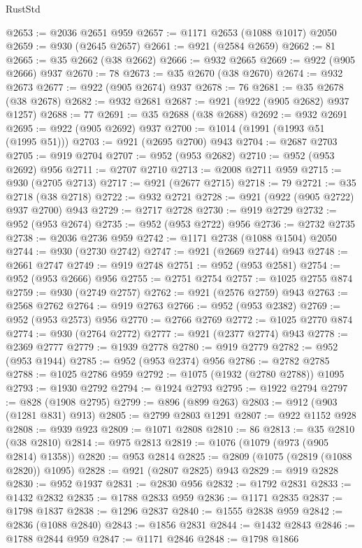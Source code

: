 \begin{lexlean}{RustStd}
\begin{coremodule}
@2653 := @2036 @2651 @959
@2657 := @1171 @2653 (@1088 @1017) @2050
@2659 := @930 (@2645 @2657)
@2661 := @921 (@2584 @2659)
@2662 := 81
@2665 := @35 @2662 (@38 @2662)
@2666 := @932 @2665
@2669 := @922 (@905 @2666) @937
@2670 := 78
@2673 := @35 @2670 (@38 @2670)
@2674 := @932 @2673
@2677 := @922 (@905 @2674) @937
@2678 := 76
@2681 := @35 @2678 (@38 @2678)
@2682 := @932 @2681
@2687 := @921 (@922 (@905 @2682) @937 @1257)
@2688 := 77
@2691 := @35 @2688 (@38 @2688)
@2692 := @932 @2691
@2695 := @922 (@905 @2692) @937
@2700 := @1014 (@1991 (@1993 @51 (@1995 @51)))
@2703 := @921 (@2695 @2700) @943
@2704 := @2687 @2703
@2705 := @919 @2704
@2707 := @952 (@953 @2682)
@2710 := @952 (@953 @2692) @956
@2711 := @2707 @2710
@2713 := @2008 @2711 @959
@2715 := @930 (@2705 @2713)
@2717 := @921 (@2677 @2715)
@2718 := 79
@2721 := @35 @2718 (@38 @2718)
@2722 := @932 @2721
@2728 := @921 (@922 (@905 @2722) @937 @2700) @943
@2729 := @2717 @2728
@2730 := @919 @2729
@2732 := @952 (@953 @2674)
@2735 := @952 (@953 @2722) @956
@2736 := @2732 @2735
@2738 := @2036 @2736 @959
@2742 := @1171 @2738 (@1088 @1504) @2050
@2744 := @930 (@2730 @2742)
@2747 := @921 (@2669 @2744) @943
@2748 := @2661 @2747
@2749 := @919 @2748
@2751 := @952 (@953 @2581)
@2754 := @952 (@953 @2666) @956
@2755 := @2751 @2754
@2757 := @1025 @2755 @874
@2759 := @930 (@2749 @2757)
@2762 := @921 (@2576 @2759) @943
@2763 := @2568 @2762
@2764 := @919 @2763
@2766 := @952 (@953 @2382)
@2769 := @952 (@953 @2573) @956
@2770 := @2766 @2769
@2772 := @1025 @2770 @874
@2774 := @930 (@2764 @2772)
@2777 := @921 (@2377 @2774) @943
@2778 := @2369 @2777
@2779 := @1939 @2778
@2780 := @919 @2779
@2782 := @952 (@953 @1944)
@2785 := @952 (@953 @2374) @956
@2786 := @2782 @2785
@2788 := @1025 @2786 @959
@2792 := @1075 (@1932 (@2780 @2788)) @1095
@2793 := @1930 @2792
@2794 := @1924 @2793
@2795 := @1922 @2794
@2797 := @828 (@1908 @2795)
@2799 := @896 (@899 @263)
@2803 := @912 (@903 (@1281 @831) @913)
@2805 := @2799 @2803 @1291
@2807 := @922 @1152 @928
@2808 := @939 @923
@2809 := @1071 @2808
@2810 := 86
@2813 := @35 @2810 (@38 @2810)
@2814 := @975 @2813
@2819 := @1076 (@1079 (@973 (@905 @2814) @1358))
@2820 := @953 @2814
@2825 := @2809 (@1075 (@2819 (@1088 @2820)) @1095)
@2828 := @921 (@2807 @2825) @943
@2829 := @919 @2828
@2830 := @952 @1937
@2831 := @2830 @956
@2832 := @1792 @2831
@2833 := @1432 @2832
@2835 := @1788 @2833 @959
@2836 := @1171 @2835
@2837 := @1798 @1837
@2838 := @1296 @2837
@2840 := @1555 @2838 @959
@2842 := @2836 (@1088 @2840)
@2843 := @1856 @2831
@2844 := @1432 @2843
@2846 := @1788 @2844 @959
@2847 := @1171 @2846
@2848 := @1798 @1866

\end{coremodule}
\end{lexlean}

